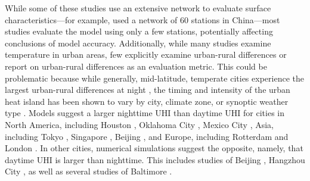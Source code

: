 \documentclass[draft,linenumbers]{agujournal}
\begin{document}
While some of these studies use an extensive network to evaluate surface characteristics---for example, \cite{miao2011impacts} used a network of 60 stations in China---most studies evaluate the model using only a few stations, potentially affecting conclusions of model accuracy. 
Additionally, while many studies examine temperature in urban areas, few explicitly examine urban-rural differences or report on urban-rural differences as an evaluation metric. This could be problematic because while generally, mid-latitude, temperate cities experience the largest urban-rural differences at night \citep{oke82,scott2018reduced}, the timing and intensity of the urban heat island has been shown to vary by city, climate zone, or synoptic weather type \citep{hardin2017urban}. 
Models suggest a larger nighttime UHI than daytime UHI for cities in North America, including Houston \citep{chen2011numerical}, Oklahoma City \citep{hu2013impact}, Mexico City \citep{cui2012seasonal}, Asia, including Tokyo \citep{kusaka2012urban}, Singapore \citep{li2013multi}, Beijing \citep{wang2013contribution}, and Europe, including Rotterdam \citep{theeuwes2014seasonal} and London \citep{grawe2013modelling}.
In other cities, numerical simulations suggest the opposite, namely, that daytime UHI is larger than nighttime. This includes studies of Beijing \citep{zhang2011impact}, Hangzhou City \citep{chen2014wrf}, as well as several studies of Baltimore \citep{zhang2011impact,li2013synergistic, li2015contrasting}.
\end{document}
